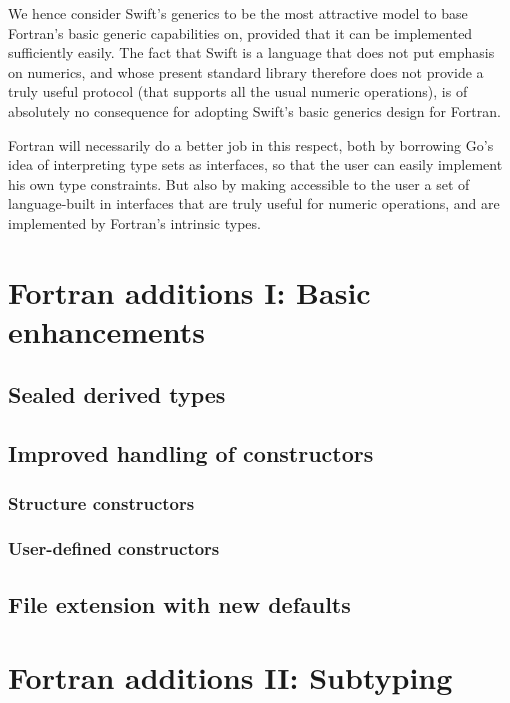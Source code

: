 \documentclass[11pt,oneside]{report}
\newcommand{\code}[1]{{\selectfont\ttfamily{#1}}}
\begin{document}
We hence consider Swift's generics to be the most attractive model to
base Fortran's basic generic capabilities on, provided that it can be
implemented sufficiently easily. The fact that Swift is a language
that does not put emphasis on numerics, and whose present standard
library therefore does not provide a truly useful \code{Numeric}
protocol (that supports all the usual numeric operations), is of
absolutely no consequence for adopting Swift's basic generics design
for Fortran.

Fortran will necessarily do a better job in this respect, both by
borrowing Go's idea of interpreting type sets as interfaces, so that
the user can easily implement his own type constraints. But also by
making accessible to the user a set of language-built in interfaces
that are truly useful for numeric operations, and are implemented by
Fortran's intrinsic types.


\chapter{Fortran additions I: Basic enhancements}

\section{Sealed derived types}

\section{Improved handling of constructors}

\subsection{Structure constructors}

\subsection{User-defined constructors}

\section{File extension with new defaults}


\chapter{Fortran additions II: Subtyping}
\end{document}
